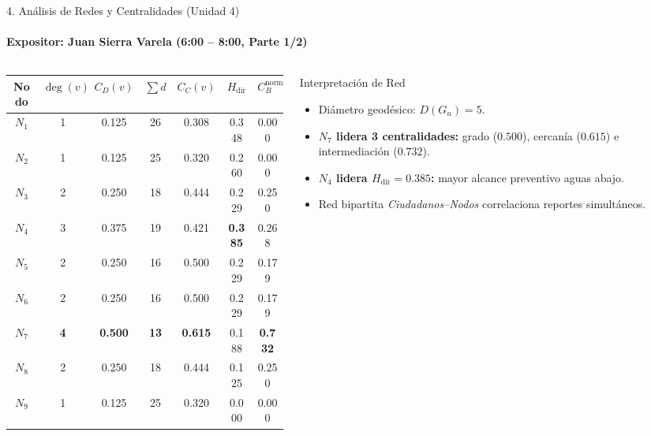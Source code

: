 \documentclass[aspectratio=169]{beamer}
\begin{document}
\begin{frame}{4. Análisis de Redes y Centralidades (Unidad 4)}
    \framesubtitle{Expositor: Juan Sierra Varela (6:00 -- 8:00, Parte 1/2)}
    \begin{columns}[T]
        \begin{column}{0.58\textwidth}
            \scriptsize
            \begin{tabular}{@{}ccccccc@{}}
                \toprule
                \textbf{Nodo} & $\deg(v)$ & $C_D(v)$ & $\sum d$ & $C_C(v)$ & $H_{\text{dir}}$ & $C_B^{\text{norm}}$ \\
                \midrule
                $N_1$ & 1 & 0.125 & 26 & 0.308 & 0.348 & 0.000 \\
                $N_2$ & 1 & 0.125 & 25 & 0.320 & 0.260 & 0.000 \\
                $N_3$ & 2 & 0.250 & 18 & 0.444 & 0.229 & 0.250 \\
                $N_4$ & 3 & 0.375 & 19 & 0.421 & \textbf{0.385} & 0.268 \\
                $N_5$ & 2 & 0.250 & 16 & 0.500 & 0.229 & 0.179 \\
                $N_6$ & 2 & 0.250 & 16 & 0.500 & 0.229 & 0.179 \\
                \textbf{$N_7$} & \textbf{4} & \textbf{0.500} & \textbf{13} & \textbf{0.615} & 0.188 & \textbf{0.732} \\
                $N_8$ & 2 & 0.250 & 18 & 0.444 & 0.125 & 0.250 \\
                $N_9$ & 1 & 0.125 & 25 & 0.320 & 0.000 & 0.000 \\
                \bottomrule
            \end{tabular}
        \end{column}
        \begin{column}{0.39\textwidth}
            \begin{block}{Interpretación de Red}
                \small
                \begin{itemize}
                    \item Diámetro geodésico: $D(G_u) = 5$.
                    \item \textbf{$N_7$ lidera 3 centralidades:} grado ($0.500$), cercanía ($0.615$) e intermediación ($0.732$).
                    \item \textbf{$N_4$ lidera $H_{\text{dir}} = 0.385$:} mayor alcance preventivo aguas abajo.
                    \item Red bipartita \textit{Ciudadanos--Nodos} correlaciona reportes simultáneos.
                \end{itemize}
            \end{block}
        \end{column}
    \end{columns}
\end{frame}
\end{document}
